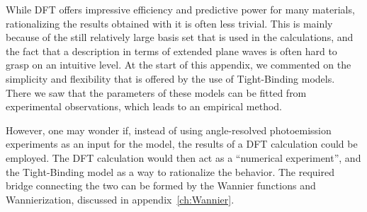 While \gls{DFT} offers impressive efficiency and predictive power for many materials, rationalizing the results obtained with it is often less trivial.
This is mainly because of the still relatively large basis set that is used in the calculations, and the fact that a description in terms of extended plane waves is often hard to grasp on an intuitive level.
At the start of this appendix, we commented on the simplicity and flexibility that is offered by the use of Tight-Binding models.
There we saw that the parameters of these models can be fitted from experimental observations, which leads to an empirical method.

However, one may wonder if, instead of using angle-resolved photoemission experiments as an input for the model, the results of a \gls{DFT} calculation could be employed.
The \gls{DFT} calculation would then act as a ``numerical experiment'', and the Tight-Binding model as a way to rationalize the behavior.
The required bridge connecting the two can be formed by the Wannier functions and Wannierization, discussed in appendix~\ref{ch:Wannier}. 
